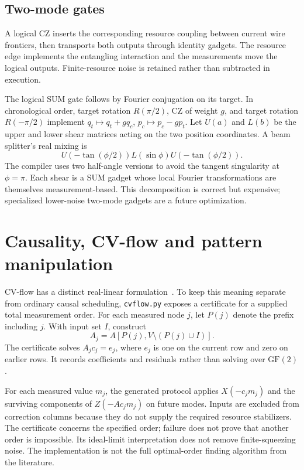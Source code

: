\documentclass[a4paper,twocolumn,11pt,nopdfoutputerror]{quantumarticle}
\begin{document}
\subsection{Two-mode gates}

A logical CZ inserts the corresponding resource coupling between current wire
frontiers, then transports both outputs through identity gadgets. The resource
edge implements the entangling interaction and the measurements move the logical
outputs. Finite-resource noise is retained rather than subtracted in execution.

The logical SUM gate follows by Fourier conjugation on its target. In
chronological order, target rotation $R(\pi/2)$, CZ of weight $g$, and target
rotation $R(-\pi/2)$ implement
$q_t\mapsto q_t+gq_c$, $p_c\mapsto p_c-gp_t$.
Let $U(a)$ and $L(b)$ be the upper and lower shear matrices acting on the two
position coordinates. A beam splitter's real mixing is
\begin{equation}
 U(-\tan(\phi/2))L(\sin\phi)U(-\tan(\phi/2)).
\end{equation}
The compiler uses two half-angle versions to avoid the tangent singularity
at $\phi=\pi$. Each shear is a SUM gadget whose local Fourier transformations
are themselves measurement-based. This decomposition is correct but expensive;
specialized lower-noise two-mode gadgets are a future optimization.

\section{Causality, CV-flow and pattern manipulation}

CV-flow has a distinct real-linear formulation~\cite{booth2023}. To keep this
meaning separate from ordinary causal scheduling, \texttt{cvflow.py} exposes
a certificate for a supplied total measurement order. For each measured node
$j$, let $P(j)$ denote the prefix including $j$. With input set $I$, construct
\begin{equation}
 A_j=A[P(j),V\setminus(P(j)\cup I)].
 \label{eq:cut}
\end{equation}
The certificate solves $A_jc_j=e_j$, where $e_j$ is one on the current row and
zero on earlier rows. It records coefficients and residuals rather than solving
over $\mathrm{GF}(2)$.

For each measured value $m_j$, the generated protocol applies
$X(-c_jm_j)$ and the surviving components of $Z(-Ac_jm_j)$ on future modes.
Inputs are excluded from correction columns because they do not supply the
required resource stabilizers. The certificate concerns the specified order;
failure does not prove that another order is impossible. Its ideal-limit
interpretation does not remove finite-squeezing noise. The implementation is
not the full optimal-order finding algorithm from the literature.
\end{document}
